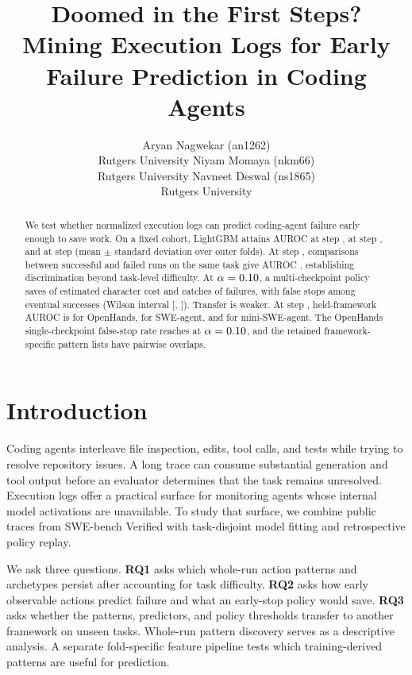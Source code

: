 \documentclass{article}
\title{Doomed in the First Steps?\\Mining Execution Logs for Early Failure Prediction in Coding Agents}
\author{Aryan Nagwekar (an1262) \\ Rutgers University
\And Niyam Momaya (nkm66) \\ Rutgers University
\And Navneet Deswal (ns1865) \\ Rutgers University}
\begin{document}
\maketitle

\begin{abstract}
We test whether normalized execution logs can predict coding-agent failure early enough to save work.
On a fixed cohort, LightGBM attains AUROC \FixedFive{} at step \StepFive{}, \FixedTwenty{} at step \StepTwenty{}, and \FixedForty{} at step \StepForty{} (mean $\pm$ standard deviation over outer folds).
At step \StepTwenty{}, comparisons between successful and failed runs on the same task give AUROC \SameTask{}, establishing discrimination beyond task-level difficulty.
At $\alpha=0.10$, a multi-checkpoint policy saves \MultiSave{} of estimated character cost and catches \MultiCatch{} of failures, with \MultiFalse{} false stops among eventual successes (Wilson interval [\MultiLo{}, \MultiHi{}]).
Transfer is weaker. At step \StepTwenty{}, held-framework AUROC is \TransferOpen{} for OpenHands, \TransferSWE{} for SWE-agent, and \TransferMini{} for mini-SWE-agent. The OpenHands single-checkpoint false-stop rate reaches \TransferFalse{} at $\alpha=0.10$, and the retained framework-specific pattern lists have \PatternOverlap{} pairwise overlaps.
\end{abstract}

\section{Introduction}
Coding agents interleave file inspection, edits, tool calls, and tests while trying to resolve repository issues. A long trace can consume substantial generation and tool output before an evaluator determines that the task remains unresolved. Execution logs offer a practical surface for monitoring agents whose internal model activations are unavailable. To study that surface, we combine public traces from SWE-bench Verified \citep{jimenez,sweverified} with task-disjoint model fitting and retrospective policy replay.

We ask three questions. \textbf{RQ1} asks which whole-run action patterns and archetypes persist after accounting for task difficulty. \textbf{RQ2} asks how early observable actions predict failure and what an early-stop policy would save. \textbf{RQ3} asks whether the patterns, predictors, and policy thresholds transfer to another framework on unseen tasks. Whole-run pattern discovery serves as a descriptive analysis. A separate fold-specific feature pipeline tests which training-derived patterns are useful for prediction.
\end{document}
